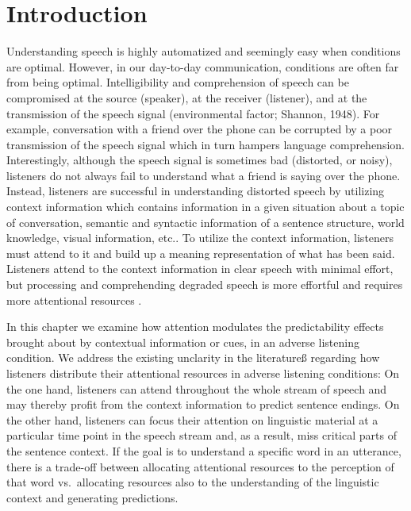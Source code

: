 \documentclass[a4paper, nobind]{templates/ociamthesis}
\begin{document}
\hypertarget{introduction-1}{%
\section{Introduction}\label{introduction-1}}

Understanding speech is highly automatized and seemingly easy when conditions are optimal.
However, in our day-to-day communication, conditions are often far from being optimal.
Intelligibility and comprehension of speech can be compromised at the source (speaker), at the receiver (listener), and at the transmission of the speech signal (environmental factor; Shannon, 1948).
For example, conversation with a friend over the phone can be corrupted by a poor transmission of the speech signal which in turn hampers language comprehension.
Interestingly, although the speech signal is sometimes bad (distorted, or noisy), listeners do not always fail to understand what a friend is saying over the phone.
Instead, listeners are successful in understanding distorted speech by utilizing context information which contains information in a given situation about a topic of conversation, semantic and syntactic information of a sentence structure, world knowledge, visual information, etc.\autocites{Kaiser2004,Knoeferle2005,Altmann2007,Xiang2015}[for reviews,][]{Stilp2020}.
To utilize the context information, listeners must attend to it and build up a meaning representation of what has been said.
Listeners attend to the context information in clear speech with minimal effort, but processing and comprehending degraded speech is more effortful and requires more attentional resources \autocite{Eckert2016,Peelle2018,Wild2012}.

In this chapter we examine how attention modulates the predictability effects brought about by contextual information or cues, in an adverse listening condition.
We address the existing unclarity in the literatureß regarding how listeners distribute their attentional resources in adverse listening conditions:
On the one hand, listeners can attend throughout the whole stream of speech and may thereby profit from the context information to predict sentence endings.
On the other hand, listeners can focus their attention on linguistic material at a particular time point in the speech stream and, as a result, miss critical parts of the sentence context.
If the goal is to understand a specific word in an utterance, there is a trade-off between allocating attentional resources to the perception of that word vs.~allocating resources also to the understanding of the linguistic context and generating predictions.
\end{document}
